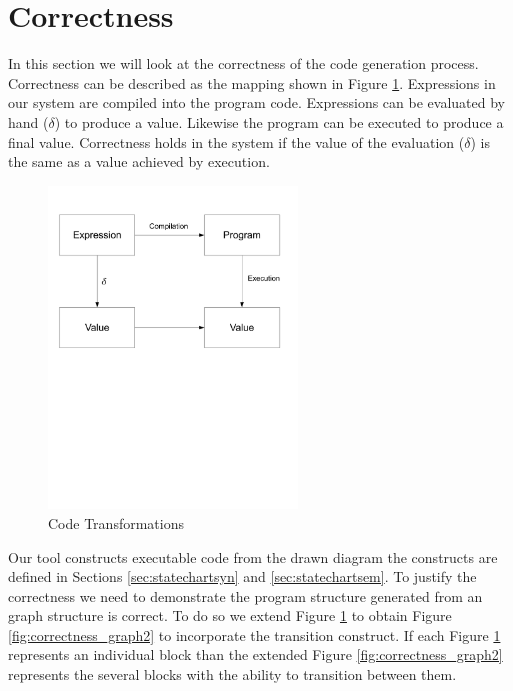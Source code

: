 \section{Correctness}

In this section we will look at the correctness of the code generation process. 
Correctness can be described as the mapping shown in Figure \ref{fig:correctness_graph1}. 
Expressions in our system are compiled into the program code. 
Expressions can be evaluated by hand ($\delta$) to produce a value. 
Likewise the program can be executed to produce a final value. 
Correctness holds in the system if the value of the evaluation ($\delta$) is the 
same as a value achieved by execution.

\begin{figure}[htb]
    \centering
    \includegraphics[trim= 10mm 120mm 10mm 10mm, clip, width=250px]{./images/correctness_graph1.pdf}
    \caption{Code Transformations}
    \label{fig:correctness_graph1}
\end{figure}

Our tool constructs executable code from the drawn diagram the constructs are 
defined in Sections \ref{sec:statechartsyn} and \ref{sec:statechartsem}. To justify 
the correctness we need 
to demonstrate the program structure generated from an graph structure is correct. 
To do so we extend Figure \ref{fig:correctness_graph1} to obtain 
Figure \ref{fig:correctness_graph2} to incorporate the transition construct. 
If each Figure \ref{fig:correctness_graph1} represents an individual block 
than the extended Figure \ref{fig:correctness_graph2} represents the several 
blocks with the ability to transition between them.

